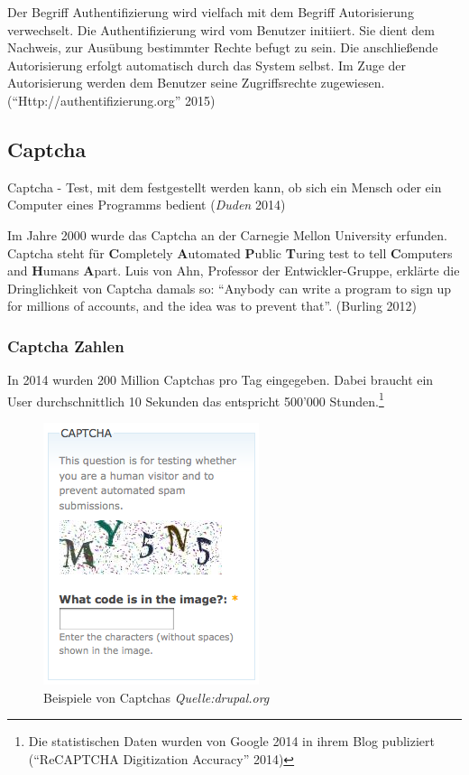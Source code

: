 Der Begriff Authentifizierung wird vielfach mit dem Begriff
Autorisierung verwechselt. Die Authentifizierung wird vom Benutzer
initiiert. Sie dient dem Nachweis, zur Ausübung bestimmter Rechte befugt
zu sein. Die anschließende Autorisierung erfolgt automatisch durch das
System selbst. Im Zuge der Autorisierung werden dem Benutzer seine
Zugriffsrechte zugewiesen. (``Http://authentifizierung.org'' 2015)

\subsection{Captcha}\label{captcha}

Captcha - Test, mit dem festgestellt werden kann, ob sich ein Mensch
oder ein Computer eines Programms bedient (\emph{Duden} 2014)

Im Jahre 2000 wurde das Captcha an der Carnegie Mellon University
erfunden. Captcha steht für \textbf{C}ompletely \textbf{A}utomated
\textbf{P}ublic \textbf{T}uring test to tell \textbf{C}omputers and
\textbf{H}umans \textbf{A}part. Luis von Ahn, Professor der
Entwickler-Gruppe, erklärte die Dringlichkeit von Captcha damals so:
``Anybody can write a program to sign up for millions of accounts, and
the idea was to prevent that''. (Burling 2012)

\subsubsection{Captcha Zahlen}\label{captcha-zahlen}

In 2014 wurden 200 Million Captchas pro Tag eingegeben. Dabei braucht
ein User durchschnittlich 10 Sekunden das entspricht 500'000
Stunden.\footnote{Die statistischen Daten wurden von Google 2014 in
  ihrem Blog publiziert (``ReCAPTCHA Digitization Accuracy'' 2014)}

\begin{figure}[htbp]
\centering
\includegraphics{images/captcha.png}
\caption{Beispiele von Captchas \emph{Quelle:drupal.org}}
\end{figure}

